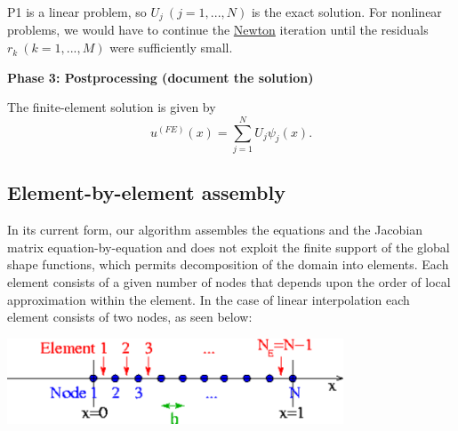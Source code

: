 \begin{DoxyItemize}
\item P1 is a linear problem, so $ U_j \ (j=1,...,N) $ is the exact solution. For nonlinear problems, we would have to continue the \hyperlink{index_Newton}{Newton} iteration until the residuals $r_k \ (k=1,...,M) $ were sufficiently small.
\end{DoxyItemize}

{\bfseries  Phase 3\+: Postprocessing (document the solution)}
\begin{DoxyItemize}
\item The finite-\/element solution is given by \[ u^{(FE)}(x) = \sum_{j=1}^{N} U_j \psi_j(x). \]
\end{DoxyItemize}

\hypertarget{index_element_by_element}{}\subsection{Element-\/by-\/element assembly}\label{index_element_by_element}
In its current form, our algorithm assembles the equations and the Jacobian matrix equation-\/by-\/equation and does not exploit the finite support of the global shape functions, which permits decomposition of the domain into elements. Each element consists of a given number of nodes that depends upon the order of local approximation within the element. In the case of linear interpolation each element consists of two nodes, as seen below\+:  
\begin{DoxyImage}
\includegraphics[width=0.75\textwidth]{1Dmesh}
\end{DoxyImage}


